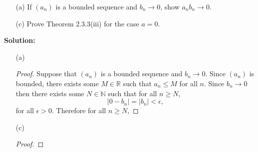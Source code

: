 \documentclass[12pt]{article}
\makeatletter
\theoremstyle{homework}
\newenvironment{exercise}[1]
{\def\@currentlabel{#1}\exercisecore}
{\endexercisecore}
\newcommand{\localhead}[1]{\par\smallskip\noindent\textbf{#1}\nobreak\\}%
\newcommand\solution{\localhead{Solution:}}
\newcommand{\Reals}{\ensuremath{\mathbb R}}
\newcommand{\Nats}{\ensuremath{\mathbb N}}
\makeatother
\begin{document}
\begin{exercise}{2.3.9(a)(c)}
\strut
\begin{enumerate}
	\item[(a)] If $(a_n)$ is a bounded sequence and $b_n\to 0$,
	show $a_nb_n\to 0$.
	\item[(c)] Prove Theorem 2.3.3(iii) for the case $a=0$.
\end{enumerate}
\end{exercise}
\solution
\begin{enumerate}
	\item[(a)] 
	\begin{proof} Suppose that $(a_n)$ is a bounded sequence and $b_n\to 0$. Since $(a_n)$ is bounded, there exists some $M \in \Reals$
		such that $a_n \le M$ for all $n$. Since $b_n \to 0$ then there exists some $N \in \Nats$ such that for all $n \geq N$, 
		\begin{equation*}
			|0 - b_n| = |b_n| < \epsilon, 
		\end{equation*} 
		for all $\epsilon > 0$. Therefore for all $n \geq N$,


	\end{proof}
	\item[(c)]
	\begin{proof}
	\end{proof}
\end{enumerate}
\end{document}
